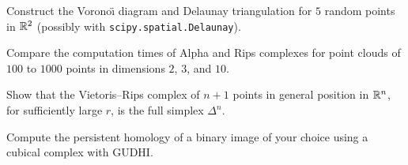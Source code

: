 \begin{exercise}
Construct the Vorono\"{\i} diagram and Delaunay triangulation for $5$
random points in $\mathbb{R}^2$ (possibly with
\texttt{scipy.spatial.Delaunay}).
\end{exercise}

\begin{exercise}
Compare the computation times of Alpha and Rips complexes for point
clouds of $100$ to $1000$ points in dimensions $2$, $3$, and $10$.
\end{exercise}

\begin{exercise}
Show that the Vietoris--Rips complex of $n+1$ points in general
position in $\mathbb{R}^n$, for sufficiently large $r$, is the full simplex
$\Delta^n$.
\end{exercise}

\begin{exercise}
Compute the persistent homology of a binary image of your choice using
a cubical complex with GUDHI.
\end{exercise}

